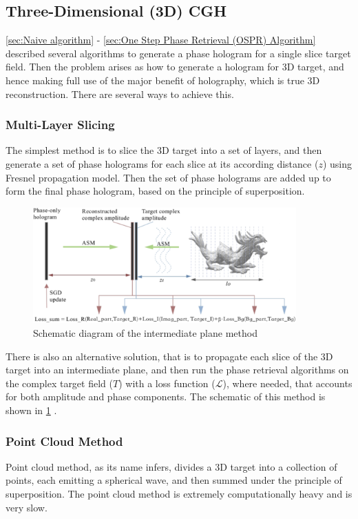 \subsection{Three-Dimensional (3D) CGH}\label{sec:Three-Dimensional (3D) CGH methods}
\cref{sec:Naive algorithm} - \cref{sec:One Step Phase Retrieval (OSPR) Algorithm} described several algorithms to generate a phase hologram for a single slice target field. Then the problem arises as how to generate a hologram for 3D target, and hence making full use of the major benefit of holography, which is true 3D reconstruction. There are several ways to achieve this.

\subsubsection{Multi-Layer Slicing}
The simplest method is to slice the 3D target into a set of layers, and then generate a set of phase holograms for each slice at its according distance ($z$) using Fresnel propagation model. Then the set of phase holograms are added up to form the final phase hologram, based on the principle of superposition.

\begin{figure}[H]
  \centering
  \includegraphics[width=0.9\textwidth]{intermediate_plane.png}
  \caption{Schematic diagram of the intermediate plane method \cite{Chen2021}}
  \label{fig:intermediate_plane}
\end{figure}

There is also an alternative solution, that is to propagate each slice of the 3D target into an intermediate plane, and then run the phase retrieval algorithms on the complex target field ($T$) with a loss function ($\mathcal{L} $), where needed, that accounts for both amplitude and phase components. The schematic of this method is shown in \cref{fig:intermediate_plane} \cite{Chen2021}.


\subsubsection{Point Cloud Method}
Point cloud method, as its name infers, divides a 3D target into a collection of points, each emitting a spherical wave, and then summed under the principle of superposition. The point cloud method is extremely computationally heavy and is very slow.



